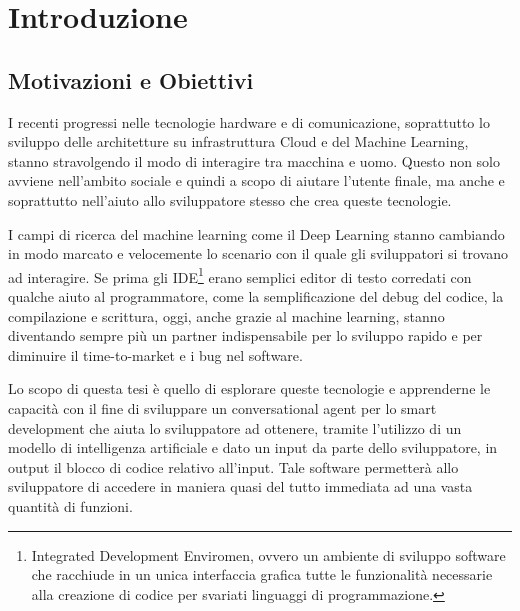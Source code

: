 \chapter{Introduzione}
 
\section{Motivazioni e Obiettivi} %
I recenti progressi nelle tecnologie hardware e di comunicazione, soprattutto lo sviluppo delle architetture su infrastruttura Cloud e del Machine Learning, stanno stravolgendo il modo di interagire tra macchina e uomo. Questo non solo avviene nell'ambito sociale e quindi a scopo di aiutare l'utente finale, ma anche e soprattutto nell'aiuto allo sviluppatore stesso che crea queste tecnologie.

I campi di ricerca del machine learning come il Deep Learning stanno cambiando in modo marcato e velocemente lo scenario con il quale gli sviluppatori si trovano ad interagire. Se prima gli IDE\footnote{Integrated Development Enviromen, ovvero un ambiente di sviluppo software che racchiude in un unica interfaccia grafica tutte le funzionalità necessarie alla creazione di codice per svariati linguaggi di programmazione.} erano semplici editor di testo corredati con qualche aiuto al programmatore, come la semplificazione del debug del codice, la compilazione e scrittura, oggi, anche grazie al machine learning, stanno diventando sempre più un partner indispensabile per lo sviluppo rapido e per diminuire il time-to-market e i bug nel software.

Lo scopo di questa tesi è quello di esplorare queste tecnologie e apprenderne le capacità con il fine di sviluppare un conversational agent per lo smart development che aiuta lo sviluppatore ad ottenere, tramite l'utilizzo di un modello di intelligenza artificiale e dato un input da parte dello sviluppatore, in output il blocco di codice relativo all'input.
Tale software permetterà allo sviluppatore di accedere in maniera quasi del tutto immediata ad una vasta quantità di funzioni.

